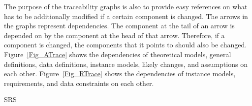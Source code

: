 \documentclass[12pt]{article}
\begin{document}
The purpose of the traceability graphs is also to provide easy references on
what has to be additionally modified if a certain component is changed.  The
arrows in the graphs represent dependencies. The component at the tail of an
arrow is depended on by the component at the head of that arrow. Therefore, if a
component is changed, the components that it points to should also be
changed. Figure~\ref{Fig_ATrace} shows the dependencies of theoretical models,
general definitions, data definitions, instance models, likely changes, and
assumptions on each other. Figure~\ref{Fig_RTrace} shows the dependencies of
instance models, requirements, and data constraints on each other.




%

\newpage



 {SRS}
\end{document}
